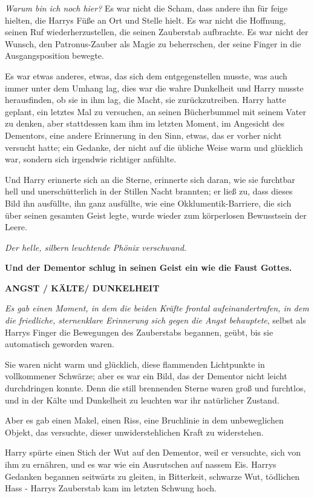 {\emph{Warum bin ich noch hier?} Es war nicht die Scham, dass andere ihn für feige hielten, die Harrys Füße an Ort und Stelle hielt. Es war nicht die Hoffnung, seinen Ruf wiederherzustellen, die seinen Zauberstab aufbrachte. Es war nicht der Wunsch, den Patronus-Zauber als Magie zu beherrschen, der seine Finger in die Ausgangsposition bewegte.

Es war etwas anderes, etwas, das sich dem entgegenstellen musste, was auch immer unter dem Umhang lag, dies war die wahre Dunkelheit und Harry musste herausfinden, ob sie in ihm lag, die Macht, sie zurückzutreiben. Harry hatte geplant, ein letztes Mal zu versuchen, an seinen Bücherbummel mit seinem Vater zu denken, aber stattdessen kam ihm im letzten Moment, im Angesicht des Dementors, eine andere Erinnerung in den Sinn, etwas, das er vorher nicht versucht hatte; ein Gedanke, der nicht auf die übliche Weise warm und glücklich war, sondern sich irgendwie richtiger anfühlte.

Und Harry erinnerte sich an die Sterne, erinnerte sich daran, wie sie furchtbar hell und unerschütterlich in der Stillen Nacht brannten; er ließ zu, dass dieses Bild ihn ausfüllte, ihn ganz ausfüllte, wie eine Okklumentik-Barriere, die sich über seinen gesamten Geist legte, wurde wieder zum körperlosen Bewusstsein der Leere.

\emph{Der helle, silbern leuchtende Phönix verschwand.}

\textbf{Und der Dementor schlug in seinen Geist ein wie die Faust Gottes.}

\textbf{ANGST / KÄLTE/ DUNKELHEIT}

\emph{Es gab einen Moment, in dem die beiden Kräfte frontal aufeinandertrafen, in dem die friedliche, sternenklare Erinnerung sich gegen die Angst behauptete}, selbst als Harrys Finger die Bewegungen des Zauberstabs begannen, geübt, bis sie automatisch geworden waren.

Sie waren nicht warm und glücklich, diese flammenden Lichtpunkte in vollkommener Schwärze; aber es war ein Bild, das der Dementor nicht leicht durchdringen konnte. Denn die still brennenden Sterne waren groß und furchtlos, und in der Kälte und Dunkelheit zu leuchten war ihr natürlicher Zustand.

Aber es gab einen Makel, einen Riss, eine Bruchlinie in dem unbeweglichen Objekt, das versuchte, dieser unwiderstehlichen Kraft zu widerstehen.

Harry spürte einen Stich der Wut auf den Dementor, weil er versuchte, sich von ihm zu ernähren, und es war wie ein Ausrutschen auf nassem Eis. Harrys Gedanken begannen seitwärts zu gleiten, in Bitterkeit, schwarze Wut, tödlichen Hass - Harrys Zauberstab kam im letzten Schwung hoch.

}
